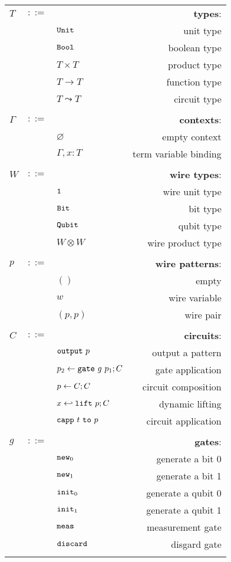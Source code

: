 \begin{longtable}[c]{lclr}
  $T$ &$::=$ &  &\textbf{types}: \\
      & &$\mathtt{Unit}$ &unit type\\
      & &$\mathtt{Bool}$ &boolean type \\
      & &$T\times T$ &product type\\
      & &$T\to T$ &function type\\
      & &$T\leadsto T$ &circuit type\\
  \\

  $\Gamma$ &$::=$ &  &\textbf{contexts}: \\
      & &$\varnothing$ &empty context\\
      & &$\Gamma,x:T$ &term variable binding\\
  \\


  $W$ &$::=$ &  &\textbf{wire types}: \\
      & &$\mathtt{1}$ &wire unit type\\
      & &$\mathtt{Bit}$ &bit type \\
      & &$\mathtt{Qubit}$ &qubit type \\
      & &$W \otimes W$ &wire product type \\
  \\

  $p$ &$::=$ &  &\textbf{wire patterns}: \\
      & &$()$ &empty\\
      & &$w$ &wire variable \\
      & &$(p,p)$ &wire pair \\
  \\

  $C$ &$::=$ &  &\textbf{circuits}: \\
      & &$\toutput\ p$ &output a pattern \\
      & &$p_2 \leftarrow \mathtt{gate}\ g\ p_1 ; C$ &gate application \\
      & &$p \leftarrow C ; C$ &circuit composition \\
      & &$x \hookleftarrow \mathtt{lift}\ p ; C$ &dynamic lifting \\
      & &$\capp\ t\ \mathtt{to}\  p$ &circuit application \\
  \\

  $g$ &$::=$ &  &\textbf{gates}: \\
      & &$\mathtt{new}_0$ &generate a bit 0 \\
      & &$\mathtt{new}_1$ &generate a bit 1 \\
      & &$\mathtt{init}_0$ &generate a qubit 0 \\
      & &$\mathtt{init}_1$ &generate a qubit 1 \\
      & &$\mathtt{meas}$ &measurement gate \\
      & &$\mathtt{discard}$ &disgard gate \\
  \\


\end{longtable}
